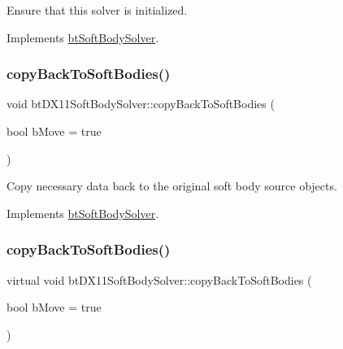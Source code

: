 Ensure that this solver is initialized. 

Implements \hyperlink{classbtSoftBodySolver_aae0adf7ffc11cd7fafec927a54c654d5}{bt\+Soft\+Body\+Solver}.

\mbox{\label{classbtDX11SoftBodySolver_a0364c3791bd12386e32e9357546aeee0}} 
\subsubsection{\texorpdfstring{copy\+Back\+To\+Soft\+Bodies()}{copyBackToSoftBodies()}\hspace{0.1cm}{\footnotesize\ttfamily [1/2]}}
{\footnotesize\ttfamily void bt\+D\+X11\+Soft\+Body\+Solver\+::copy\+Back\+To\+Soft\+Bodies (\begin{DoxyParamCaption}\item[{bool}]{b\+Move = {\ttfamily true} }\end{DoxyParamCaption})\hspace{0.3cm}{\ttfamily [virtual]}}

Copy necessary data back to the original soft body source objects. 

Implements \hyperlink{classbtSoftBodySolver_ac4034ba178cb75bd880a44958eaa38d1}{bt\+Soft\+Body\+Solver}.

\mbox{\label{classbtDX11SoftBodySolver_aa0f25b116d336dabb716c8cd08f940b7}} 
\subsubsection{\texorpdfstring{copy\+Back\+To\+Soft\+Bodies()}{copyBackToSoftBodies()}\hspace{0.1cm}{\footnotesize\ttfamily [2/2]}}
{\footnotesize\ttfamily virtual void bt\+D\+X11\+Soft\+Body\+Solver\+::copy\+Back\+To\+Soft\+Bodies (\begin{DoxyParamCaption}\item[{bool}]{b\+Move = {\ttfamily true} }\end{DoxyParamCaption})\hspace{0.3cm}{\ttfamily [virtual]}}


